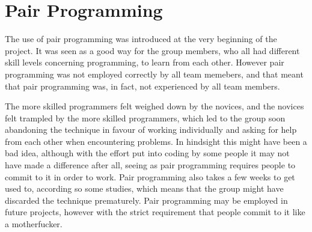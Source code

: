 \section{Pair Programming}
The use of pair programming was introduced at the very beginning of the project. It was seen as a good way for the group
members, who all had different skill levels concerning programming, to learn from each other. However pair programming was not
employed correctly by all team memebers, and that meant that pair programming was, in fact, not experienced by all team
members. 

The more skilled programmers felt weighed down by the novices, and the novices felt trampled by the more skilled
programmers, which led to the group soon abandoning the technique in favour of working individually and asking for help from
each other when encountering problems. In hindsight this might have been a bad idea, although with the effort put into coding
by some people it may not have made a difference after all, seeing as pair programming requires people to commit to it in
order to work. Pair programming also takes a few weeks to get used to, according so some studies, which means that the group
might have discarded the technique prematurely. Pair programming may be employed in future projects, however with the strict
requirement that people commit to it like a motherfucker.
